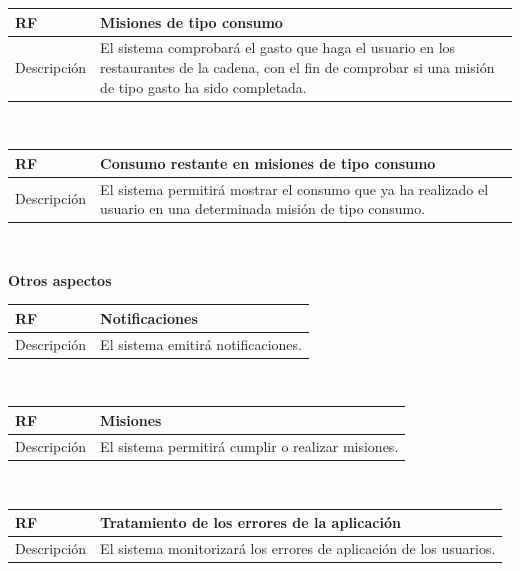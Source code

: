 \documentclass[twoside]{report}
\newcommand\addrow[2]{#1 &#2\\ }
\newcommand\addheading[2]{#1 &#2\\ \hline}
\newcommand\tabularhead{\begin{tabular}{lp{0.7\textwidth}}
\hline
}
\newenvironment{req}{\tabularhead}
{\hline\end{tabular}}
\begin{document}
\vspace{0.25cm}

\begin{req}
	\addheading{\textbf{RF\arabic{functionalRequirements}}}{Misiones de tipo consumo}
	\addrow{Descripción}{El sistema comprobará el gasto que haga el usuario en los restaurantes de la cadena, con el fin de comprobar si una misión de tipo gasto ha sido completada.}
\end{req}\\

\vspace{0.25cm}

\begin{req}
	\addheading{\textbf{RF\arabic{functionalRequirements}}}{Consumo restante en misiones de tipo consumo}
	\addrow{Descripción}{El sistema permitirá mostrar el consumo que ya ha realizado el usuario en una determinada misión de tipo consumo.}
\end{req}\\

\vspace{1cm}

\textbf{Otros aspectos}\\

\begin{req}
	\addheading{\textbf{RF\arabic{functionalRequirements}}}{Notificaciones}
	\addrow{Descripción}{El sistema emitirá notificaciones.}
\end{req}\\

\vspace{0.25cm}

\begin{req}
	\addheading{\textbf{RF\arabic{functionalRequirements}}}{Misiones}
	\addrow{Descripción}{El sistema permitirá cumplir o realizar misiones.}
\end{req}\\

\vspace{0.25cm}

\begin{req}
	\addheading{\textbf{RF\arabic{functionalRequirements}}}{Tratamiento de los errores de la aplicación}
	\addrow{Descripción}{El sistema monitorizará los errores de aplicación de los usuarios.}
\end{req}\\
\end{document}
